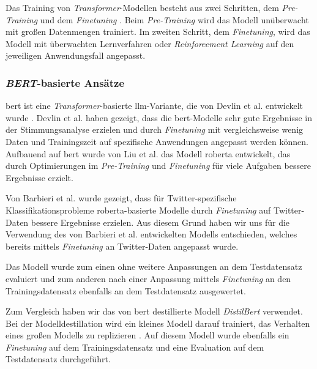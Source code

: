 Das Training von \textit{Transformer}-Modellen besteht aus zwei Schritten, dem \textit{Pre-Training} und dem \textit{Finetuning} \cite{Radford2018ImprovingLU}.
Beim \textit{Pre-Training} wird das Modell unüberwacht mit großen Datenmengen trainiert.
Im zweiten Schritt, dem \textit{Finetuning}, wird das Modell mit überwachten Lernverfahren oder \textit{Reinforcement Learning} \cite{deepseekai2025deepseekr1incentivizingreasoningcapability, devlin2018bert} auf den jeweiligen Anwendungsfall angepasst.


\subsubsection{\textit{BERT}-basierte Ansätze}\label{subsec:bert}

\gls{bert} ist eine \textit{Transformer}-basierte \gls{llm}-Variante, die von Devlin et al. entwickelt wurde \cite{devlin2018bert}.
Devlin et al. haben gezeigt, dass die \gls{bert}-Modelle sehr gute Ergebnisse in der Stimmungsanalyse erzielen und durch \textit{Finetuning} mit vergleichsweise wenig Daten und Trainingszeit auf spezifische Anwendungen angepasst werden können.
Aufbauend auf \gls{bert} wurde von Liu et al. \cite{liu2019roberta} das Modell \gls{roberta} entwickelt, das durch Optimierungen im \textit{Pre-Training} und \textit{Finetuning} für viele Aufgaben bessere Ergebnisse erzielt.

Von Barbieri et al. \cite{barbieri2020tweeteval} wurde gezeigt, dass für Twitter-spezifische Klassifikationsprobleme \gls{roberta}-basierte Modelle durch \textit{Finetuning} auf Twitter-Daten bessere Ergebnisse erzielen.
Aus diesem Grund haben wir uns für die Verwendung des von Barbieri et al. entwickelten Modells entschieden, welches bereits mittels \textit{Finetuning} an Twitter-Daten angepasst wurde.

Das Modell wurde zum einen ohne weitere Anpassungen an dem Testdatensatz evaluiert und zum anderen nach einer Anpassung mittels \textit{Finetuning} an den Trainingsdatensatz ebenfalls an dem Testdatensatz ausgewertet.

Zum Vergleich haben wir das von \gls{bert} destillierte Modell \textit{DistilBert} \cite{sanh2019distilbert} verwendet.
Bei der Modelldestillation wird ein kleines Modell darauf trainiert, das Verhalten eines großen Modells zu replizieren \cite{sanh2019distilbert}.
Auf diesem Modell wurde ebenfalls ein \textit{Finetuning} auf dem Trainingsdatensatz und eine Evaluation auf dem Testdatensatz durchgeführt.


